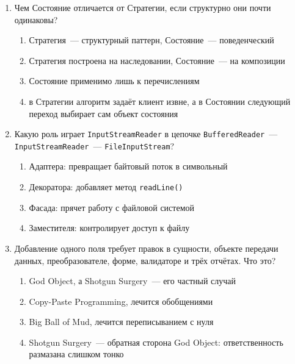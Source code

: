 \begin{enumerate}
\item Чем Состояние отличается от Стратегии, если структурно они почти
      одинаковы?
  \begin{enumerate}
    \item[а)] Стратегия~--- структурный паттерн, Состояние~--- поведенческий
    \item[б)] Стратегия построена на наследовании, Состояние~--- на композиции
    \item[в)] Состояние применимо лишь к перечислениям
    \item[г)] в Стратегии алгоритм задаёт клиент извне, а в Состоянии
              следующий переход выбирает сам объект состояния
  \end{enumerate}

\item Какую роль играет \texttt{InputStreamReader} в цепочке
      \texttt{BufferedReader}~--- \texttt{InputStreamReader}~---
      \texttt{FileInputStream}?
  \begin{enumerate}
    \item[а)] Адаптера: превращает байтовый поток в символьный
    \item[б)] Декоратора: добавляет метод \texttt{readLine()}
    \item[в)] Фасада: прячет работу с файловой системой
    \item[г)] Заместителя: контролирует доступ к файлу
  \end{enumerate}

\item Добавление одного поля требует правок в сущности, объекте передачи
      данных, преобразователе, форме, валидаторе и трёх отчётах. Что это?
  \begin{enumerate}
    \item[а)] God Object, а Shotgun Surgery~--- его частный случай
    \item[б)] Copy-Paste Programming, лечится обобщениями
    \item[в)] Big Ball of Mud, лечится переписыванием с нуля
    \item[г)] Shotgun Surgery~--- обратная сторона God Object:
              ответственность размазана слишком тонко
  \end{enumerate}

\end{enumerate}
